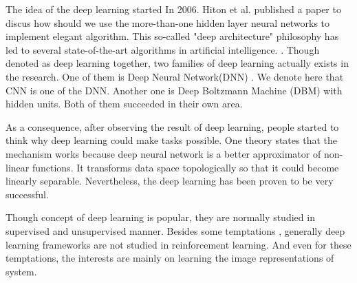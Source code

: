 \documentclass{article}
\begin{document}
The idea of the deep learning started In 2006. Hiton et al. published a paper \cite{hinton2006fast} to discus how should we use the more-than-one hidden layer neural networks to implement elegant algorithm. This so-called "deep architecture" philosophy has led to several state-of-the-art algorithms in artificial intelligence.  \cite{lecun1998gradient} \cite{hinton2012deep}.  Though denoted as deep learning together, two families of deep learning actually exists in the research. One of them is Deep Neural Network(DNN) \cite{fukushima1980neocognitron}\cite{lecun1998gradient}. We denote here that CNN is one of the DNN. Another one is Deep Boltzmann Machine (DBM)\cite{hinton1986learning} with hidden units. Both of them succeeded in their own area.

As a consequence, after observing the result of deep learning, people started to think why deep learning could make tasks possible. One theory states that the mechanism works because deep neural network is a better approximator of non-linear functions. It transforms data space topologically so that it could become linearly separable. Nevertheless, the deep learning has been proven to be very successful.

Though concept of deep learning is popular, they are normally studied in supervised and unsupervised manner. Besides some temptations \citep{mnih2013playing}\citep{lenz2013deep}, generally deep learning frameworks are not studied in reinforcement learning. And even for these temptations, the interests are mainly on learning the image representations of system.
\end{document}
